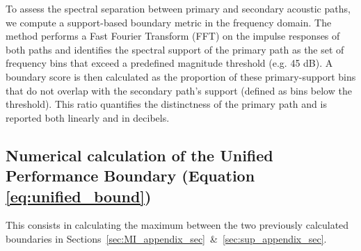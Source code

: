 \documentclass{article}
\begin{document}
To assess the spectral separation between primary and secondary acoustic paths, we compute a support-based boundary metric in the frequency domain. The method performs a Fast Fourier Transform (FFT) on the impulse responses of both paths and identifies the spectral support of the primary path as the set of frequency bins that exceed a predefined magnitude threshold (e.g. 45 dB). A boundary score is then calculated as the proportion of these primary-support bins that do not overlap with the secondary path's support (defined as bins below the threshold). This ratio quantifies the distinctness of the primary path and is reported both linearly and in decibels.

\subsection{Numerical calculation of the Unified Performance Boundary (Equation \ref{eq:unified_bound})}

This consists in calculating the maximum between the two previously calculated boundaries in Sections~\ref{sec:MI_appendix_sec}~\&~\ref{sec:sup_appendix_sec}.
\end{document}
